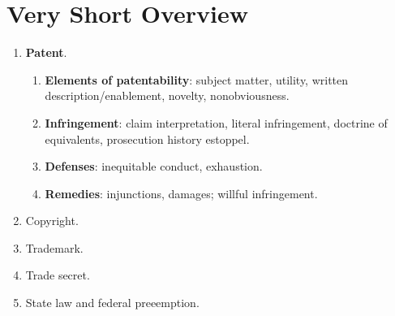 \section{Very Short Overview}

\begin{enumerate}
    \item \textbf{Patent}.
    \begin{enumerate}
        \item \textbf{Elements of patentability}: subject matter, utility, written 
        description/enablement, novelty, nonobviousness.
        \item \textbf{Infringement}: claim interpretation, literal infringement, 
        doctrine of equivalents, prosecution history estoppel.
        \item \textbf{Defenses}: inequitable conduct, exhaustion.
        \item \textbf{Remedies}: injunctions, damages; willful infringement.
    \end{enumerate}
    \item Copyright.
    \item Trademark.
    \item Trade secret.
    \item State law and federal preeemption.
\end{enumerate}
